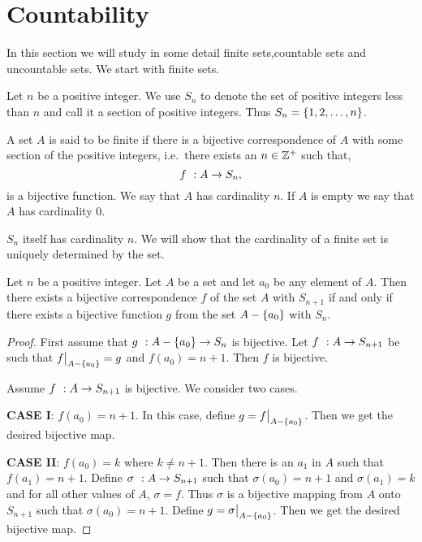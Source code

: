 \section{Countability}
In this section we will study in some detail finite sets,countable sets and uncountable sets.
We start with finite sets.
\begin{Definition}[name=section]
    Let $n$ be a positive integer. We use $S_n$ to denote the set of positive integers less than $n$ and call
    it a section of positive integers. Thus $S_n = \left\lbrace{1,2,\ldots,n}\right\rbrace$.
\end{Definition}
\begin{Definition}[name=finite sets]
    A set $A$ is said to be finite if there is a bijective correspondence of $A$ with some section of the
    positive integers, i.e.~there exists an $n \in \mathbb{Z}^{+}$ such that,
    \[{f}\hspace{0.05in}:{A}\to{S_n},\]
    is a bijective function. We say that $A$ has cardinality $n$. If $A$ is empty we say that $A$ has
    cardinality $0$.
\end{Definition}
\begin{Remark}
    $S_n$ itself has cardinality $n$. We will show that the cardinality of a finite set is uniquely determined
    by the set.
\end{Remark}
\begin{Lemma}
    Let $n$ be a positive integer. Let $A$ be a set and let $a_0$ be any element of $A$. Then there exists a
    bijective correspondence $f$ of the set $A$ with $S_{n+1}$ if and only if there exists a bijective
    function $g$ from the set ${A}-{\left\lbrace{a_0}\right\rbrace}$ with $S_{n}$.
\end{Lemma}
\begin{proof}
    First assume that ${g}\hspace{0.05in}:{{A}-{\left\lbrace{a_0}\right\rbrace}}\to{S_n}$ is bijective. Let ${f}\hspace{0.05in}:{A}\to{S_{n+1}}$ be such
    that $\restrict{f}{\setDiff{A}{\setX{a_0}}} = g $ and $f(a_0) = n+1$. Then $f$ is bijective.

    Assume ${f}\hspace{0.05in}:{A}\to{S_{n+1}}$ is bijective. We consider two cases.

    \textbf{CASE I}: $f(a_0) = n+1$. In this case, define $g = \restrict{f}{\setDiff{A}{\setX{a_0}}}$. Then we
    get the desired bijective map.

    \textbf{CASE II}: $f(a_0) = k$ where $k \neq n+1$. Then there is an $a_1$ in $A$ such that $f(a_1) = n+1$.
    Define ${\sigma}\hspace{0.05in}:{A}\to{S_{n+1}}$ such that $\sigma(a_0) = n+1$ and $\sigma(a_1) = k$ and for all other
    values of $A$, $\sigma = f$. Thus $\sigma$ is a bijective mapping from $A$ onto $S_{n+1}$ such that
    $\sigma(a_0) = n+1$. Define $g = \restrict{\sigma}{\setDiff{A}{\setX{a_0}}}$. Then we
    get the desired bijective map.
\end{proof}
